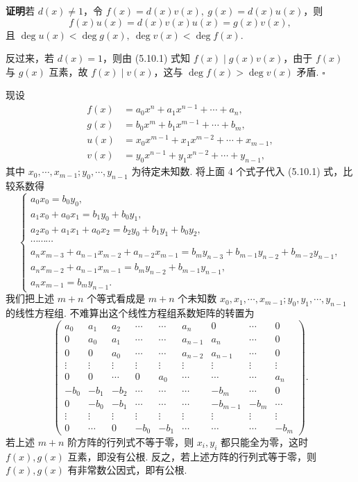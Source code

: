 \documentclass[UTF8, 12pt, fontset=fandol, oneside]{ctexart}
\begin{document}
\noindent\textbf{证明}\quad 若 $d(x)\neq 1$，令 $f(x)=d(x)v(x),\ g(x)=d(x)u(x)$，则
\[
f(x)u(x)=d(x)v(x)u(x)=g(x)v(x),
\]
且 $\deg u(x)<\deg g(x),\ \deg v(x)<\deg f(x)$.

反过来，若 $d(x)=1$，则由 (5.10.1) 式知 $f(x)\mid g(x)v(x)$，由于 $f(x)$ 与 $g(x)$ 互素，故 $f(x)\mid v(x)$，这与 $\deg f(x)>\deg v(x)$ 矛盾. $\square$

现设
\[
\begin{aligned}
f(x)&=a_0x^n+a_1x^{n-1}+\cdots+a_n,\\
g(x)&=b_0x^m+b_1x^{m-1}+\cdots+b_m,\\
u(x)&=x_0x^{m-1}+x_1x^{m-2}+\cdots+x_{m-1},\\
v(x)&=y_0x^{n-1}+y_1x^{n-2}+\cdots+y_{n-1},
\end{aligned}
\]
其中 $x_0,\cdots,x_{m-1};y_0,\cdots,y_{n-1}$ 为待定未知数. 将上面 4 个式子代入 (5.10.1) 式，比较系数得
\[
\begin{cases}
a_0x_0=b_0y_0,\\
a_1x_0+a_0x_1=b_1y_0+b_0y_1,\\
a_2x_0+a_1x_1+a_0x_2=b_2y_0+b_1y_1+b_0y_2,\\
\cdots\cdots\cdots\\
a_nx_{m-3}+a_{n-1}x_{m-2}+a_{n-2}x_{m-1}=b_my_{n-3}+b_{m-1}y_{n-2}+b_{m-2}y_{n-1},\\
a_nx_{m-2}+a_{n-1}x_{m-1}=b_my_{n-2}+b_{m-1}y_{n-1},\\
a_nx_{m-1}=b_my_{n-1}.
\end{cases}
\]
我们把上述 $m+n$ 个等式看成是 $m+n$ 个未知数 $x_0,x_1,\cdots,x_{m-1};y_0,y_1,\cdots,y_{n-1}$ 的线性方程组. 不难算出这个线性方程组系数矩阵的转置为
\[
\begin{pmatrix}
a_0&a_1&a_2&\cdots&\cdots&a_n&0&\cdots&0\\
0&a_0&a_1&\cdots&\cdots&a_{n-1}&a_n&\cdots&0\\
0&0&a_0&\cdots&\cdots&a_{n-2}&a_{n-1}&\cdots&0\\
\vdots&\vdots&\vdots&\vdots&\vdots&\vdots&\vdots&\vdots&\vdots\\
0&0&\cdots&0&a_0&\cdots&\cdots&\cdots&a_n\\
-b_0&-b_1&-b_2&\cdots&\cdots&\cdots&-b_m&\cdots&0\\
0&-b_0&-b_1&\cdots&\cdots&\cdots&-b_{m-1}&-b_m&\cdots\\
\vdots&\vdots&\vdots&\vdots&\vdots&\vdots&\vdots&\vdots&\vdots\\
0&\cdots&0&-b_0&-b_1&\cdots&\cdots&\cdots&-b_m
\end{pmatrix}.
\]
若上述 $m+n$ 阶方阵的行列式不等于零，则 $x_i,y_i$ 都只能全为零，这时 $f(x),g(x)$ 互素，即没有公根. 反之，若上述方阵的行列式等于零，则 $f(x),g(x)$ 有非常数公因式，即有公根.
\end{document}
